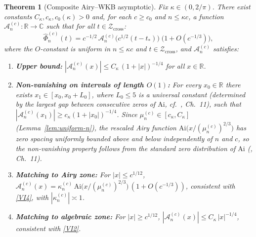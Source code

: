 \documentclass[12pt,a4paper]{amsart}
\newtheorem{theorem}{Theorem}[section]
\theoremstyle{definition}
\theoremstyle{remark}
\newcommand{\Ai}{\mathrm{Ai}}
\newcommand{\Zcross}{\mathcal{Z}_{\mathrm{cross}}}
\newcommand{\tstar}{t_*}
\begin{document}
\begin{theorem}[Composite Airy--WKB asymptotic]
\label{thm:A}
Fix $\kappa \in (0,2/\pi)$.
There exist constants $C_\kappa, c_\kappa, c_0(\kappa) > 0$
and, for each $c \ge c_0$ and $n \le \kappa c$,
a function $\mathcal{A}_n^{(c)} : \mathbb{R} \to \mathbb{C}$
such that for all $t \in \Zcross$:
\begin{equation}
\label{eq:composite-A}
\widehat{\Phi}_n^{(c)}(t)
= c^{-1/2}\,\mathcal{A}_n^{(c)}\!\bigl(c^{1/2}(t-\tstar)\bigr)
\;\bigl(1 + O(c^{-1/3})\bigr),
\end{equation}
where the $O$-constant is uniform in $n \le \kappa c$
and $t \in \Zcross$, and $\mathcal{A}_n^{(c)}$ satisfies:
\begin{enumerate}[\rm(a)]
\item\label{thm:A-upper}
\textbf{Upper bound:}
$|\mathcal{A}_n^{(c)}(x)|
\le C_\kappa\,(1+|x|)^{-1/4}$
for all $x \in \mathbb{R}$.
\item\label{thm:A-lower}
\textbf{Non-vanishing on intervals of length $O(1)$:}
For every $x_0 \in \mathbb{R}$ there exists
$x_1 \in [x_0, x_0 + L_0]$,
where $L_0 \le 5$ is a universal constant
(determined by the largest gap between consecutive
zeros of $\Ai$, cf.~\cite{Olver1974}, Ch.~11),
such that $|\mathcal{A}_n^{(c)}(x_1)| \ge c_\kappa(1+|x_0|)^{-1/4}$.
Since $\mu_n^{(c)} \in [c_\kappa, C_\kappa]$
(Lemma~\ref{lem:uniform-n}),
the rescaled Airy function
$\Ai\!\bigl(x/(\mu_n^{(c)})^{2/3}\bigr)$
has zero spacing uniformly bounded above and below
independently of $n$ and $c$,
so the non-vanishing property follows from
the standard zero distribution of $\Ai$
\textup{(\cite{Olver1974}, Ch.~11)}.
\item\label{thm:A-match-airy}
\textbf{Matching to Airy zone:}
For $|x| \le c^{1/12}$,
$\mathcal{A}_n^{(c)}(x)
= \kappa_n^{(c)}\,\Ai\!\bigl(x/(\mu_n^{(c)})^{2/3}\bigr)
\,(1 + O(c^{-1/3}))$,
consistent with \eqref{VI4},
with $|\kappa_n^{(c)}| \asymp 1$.
\item\label{thm:A-match-WKB}
\textbf{Matching to algebraic zone:}
For $|x| \ge c^{1/12}$,
$|\mathcal{A}_n^{(c)}(x)| \le C_\kappa\,|x|^{-1/4}$,
consistent with \eqref{VI2}.
\end{enumerate}
\end{theorem}
\end{document}
